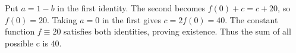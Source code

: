 Put $a=1-b$ in the first identity. The second becomes $f(0)+c=c+20$, so $f(0)=20$. Taking $a=0$ in the first gives $c=2f(0)=40$. The constant function $f\equiv20$ satisfies both identities, proving existence. Thus the sum of all possible c is $\boxed{40}$.
